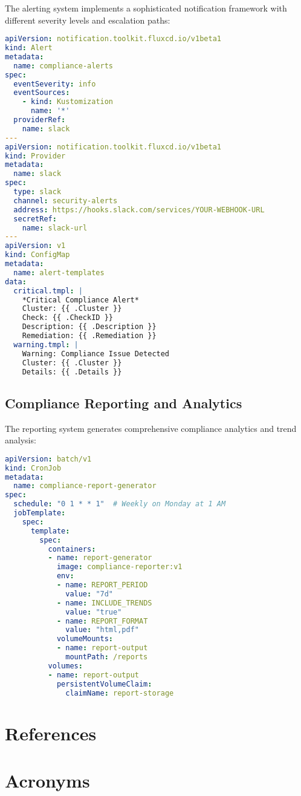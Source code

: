 \documentclass[PMO,lsstdraft,authoryear,toc]{lsstdoc}
\begin{document}
The alerting system implements a sophisticated notification framework with different severity levels and escalation paths:

\begin{lstlisting}[language=yaml]
apiVersion: notification.toolkit.fluxcd.io/v1beta1
kind: Alert
metadata:
  name: compliance-alerts
spec:
  eventSeverity: info
  eventSources:
    - kind: Kustomization
      name: '*'
  providerRef:
    name: slack
---
apiVersion: notification.toolkit.fluxcd.io/v1beta1
kind: Provider
metadata:
  name: slack
spec:
  type: slack
  channel: security-alerts
  address: https://hooks.slack.com/services/YOUR-WEBHOOK-URL
  secretRef:
    name: slack-url
---
apiVersion: v1
kind: ConfigMap
metadata:
  name: alert-templates
data:
  critical.tmpl: |
    *Critical Compliance Alert*
    Cluster: {{ .Cluster }}
    Check: {{ .CheckID }}
    Description: {{ .Description }}
    Remediation: {{ .Remediation }}
  warning.tmpl: |
    Warning: Compliance Issue Detected
    Cluster: {{ .Cluster }}
    Details: {{ .Details }}
\end{lstlisting}

\subsection{Compliance Reporting and Analytics}

The reporting system generates comprehensive compliance analytics and trend analysis:

\begin{lstlisting}[language=yaml]
apiVersion: batch/v1
kind: CronJob
metadata:
  name: compliance-report-generator
spec:
  schedule: "0 1 * * 1"  # Weekly on Monday at 1 AM
  jobTemplate:
    spec:
      template:
        spec:
          containers:
          - name: report-generator
            image: compliance-reporter:v1
            env:
            - name: REPORT_PERIOD
              value: "7d"
            - name: INCLUDE_TRENDS
              value: "true"
            - name: REPORT_FORMAT
              value: "html,pdf"
            volumeMounts:
            - name: report-output
              mountPath: /reports
          volumes:
          - name: report-output
            persistentVolumeClaim:
              claimName: report-storage
\end{lstlisting}

\appendix
\section{References} \label{sec:bib}
\renewcommand{\refname}{} %


\section{Acronyms} \label{sec:acronyms}

\end{document}
